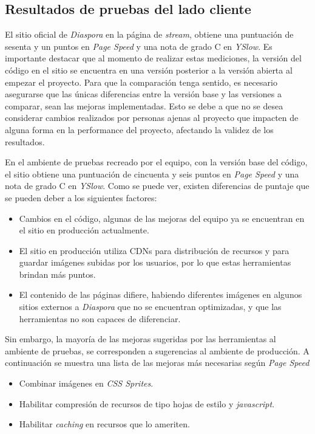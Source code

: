 \subsection{Resultados de pruebas del lado cliente}

El sitio oficial de \emph{Diaspora} en la página de \emph{stream}, obtiene una puntuación de sesenta y un puntos en \emph{Page Speed} y una nota de grado C en \emph{YSlow}. Es 
importante destacar que al momento de realizar estas mediciones, la versión del código en el sitio se encuentra en una versión posterior a la versión abierta al empezar el proyecto. 
Para que la comparación tenga sentido, es necesario asegurarse que las únicas diferencias entre la versión base y las versiones a comparar, sean las mejoras implementadas. Esto se 
debe a que no se desea considerar cambios realizados por personas ajenas al proyecto que impacten de alguna forma en la performance del proyecto, afectando la validez de los 
resultados.

En el ambiente de pruebas recreado por el equipo, con la versión base del código, el sitio obtiene una puntuación de cincuenta y seis puntos en \emph{Page Speed} y una nota de
grado C en \emph{YSlow}. Como se puede ver, existen diferencias de puntaje que se pueden deber a los siguientes factores:

\begin{itemize}
	\item
	Cambios en el código, algunas de las mejoras del equipo ya se encuentran en el sitio en producción actualmente.
	\item
	El sitio en producción utiliza CDNs para distribución de recursos y para guardar imágenes subidas por los usuarios, por lo que estas herramientas brindan más puntos.
	\item
	El contenido de las páginas difiere, habiendo diferentes imágenes en algunos sitios externos a \emph{Diaspora} que no se encuentran optimizadas, y que las herramientas
	no son capaces de diferenciar.
\end{itemize}

Sin embargo, la mayoría de las mejoras sugeridas por las herramientas al ambiente de pruebas, se corresponden a sugerencias al ambiente de producción. A continuación se muestra 
una lista de las mejoras más necesarias según \emph{Page Speed}
\begin{itemize}
	\item
	Combinar imágenes en \emph{CSS Sprites}.
	\item
	Habilitar compresión de recursos de tipo hojas de estilo y \emph{javascript}.
	\item
	Habilitar \emph{caching} en recursos que lo ameriten.	
\end{itemize}

